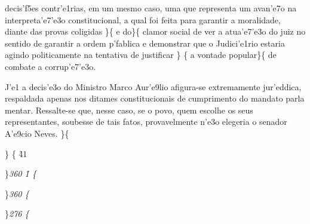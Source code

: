 decis'f5es contr'e1rias, em um mesmo caso, uma que representa um
avan'e7o na interpreta'e7'e3o constitucional, a qual foi feita para
garantir a moralidade, diante das provas coligidas \}\{\rtlch{} 
\ltrch{}  e do\}\{\rtlch{}  \ltrch{}
 clamor social de ver a atua'e7'e3o do juiz no
sentido de garantir a ordem p'fablica e demonstrar que o Judici'e1rio
estaria agindo politicamente na tentativa de justificar \} \{\rtlch{}
 \ltrch{}  a vontade popular\}\{\rtlch{}
 \ltrch{}  de combate a corrup'e7'e3o.
\par J'e1 a decis'e3o do Ministro Marco Aur'e9lio afigura-se
extremamente jur'eddica, respaldada apenas nos ditames constitucionais
de cumprimento do mandato parla mentar. Ressalte-se que, nesse caso, se
o povo, quem escolhe os seus representantes, soubesse de tais fatos,
provavelmente n'e3o elegeria o senador A'e9cio Neves. \}\{\rtlch{}
 \ltrch{} 
\par \}\pard \ltrpar{}\ql {}\widctlpar\wrapdefault\aspalpha\aspnum\fahang\adjustright{}
 \{\rtlch{}  \ltrch{}
\f41
\par \}\pard\plain \ltrpar\qj {}\sl360\widctlpar\wrapdefault\aspalpha\aspnum\faauto\adjustright{} \rtlch{}  \ltrch{} \f1\cgrid{} \{
\rtlch{}  \ltrch{} 
\par \}\pard \ltrpar\qj {}\sl360\widctlpar\wrapdefault\aspalpha\aspnum\faauto\adjustright{} {\rtlch{}  \ltrch{}  \tab }\{\rtlch{}
 \ltrch{} 
\par \}\pard \ltrpar\ql {}\sl276\widctlpar\wrapdefault\aspalpha\aspnum\faauto\adjustright{} {\rtlch{}  \ltrch{}  \page }\{\rtlch{}
 \ltrch{} 

\par 

